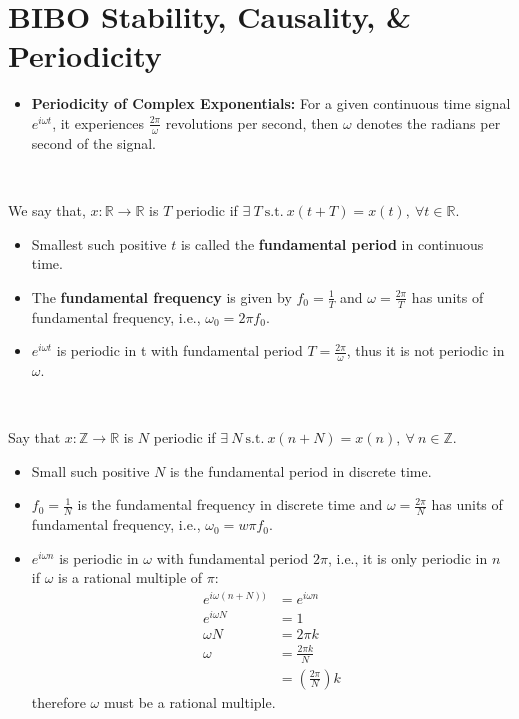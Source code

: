 \section{BIBO Stability, Causality, \& Periodicity}
\begin{itemize}
	\item \textbf{Periodicity of Complex Exponentials:} For a given continuous
	      time signal $e^{i\omega t}$, it experiences $\frac{2\pi}{\omega}$ revolutions per second,
	      then $\omega$ denotes the radians per second of the signal.
\end{itemize}
\begin{theorem}~

	We say that, $x: \mathbb{R} \to \mathbb{R}$ is $T$ periodic if
	$\exists\ T\ \mathrm{s.t.}\ x(t +T) = x(t),\ \forall t \in \mathbb{R}$.
\end{theorem}
\begin{itemize}
	\item Smallest such positive $t$ is called the
	      \textbf{fundamental period} in continuous time.
	\item The \textbf{fundamental frequency} is given by $f_0 = \frac{1}{T}$
	      and $\omega = \frac{2\pi}{T}$ has units of fundamental frequency, i.e.,
	      $\omega_0 = 2\pi f_0$.
	\item $e^{i\omega t}$ is periodic in t with fundamental period $T = \frac{2\pi}{\omega}$,
	      thus it is not periodic in $\omega$.
\end{itemize}
\begin{theorem}~

	Say that $x: \mathbb{Z} \to \mathbb{R}$
	is $N$ periodic if $\exists\ N \ \mathrm{s.t.}\ x(n+N) = x(n),\ \forall\ n \in \mathbb{Z}$.
\end{theorem}
\begin{itemize}
	\item Small such positive $N$ is the fundamental period in discrete time.
	\item $f_{0} = \frac{1}{N}$ is the fundamental frequency in discrete time
	      and $\omega = \frac{2\pi}{N}$ has units of fundamental frequency, i.e.,
	      $\omega_0 = w\pi f_0$.
	\item $e^{i\omega n}$ is periodic in $\omega$ with fundamental period
	      $2\pi$, i.e., it is only periodic in $n$ if $\omega$ is a rational
	      multiple of $\pi$:
	      \begin{align*}
		      e^{i\omega(n+N))} & = e^{i\omega n}     \\
		      e^{i\omega N}     & = 1                 \\
		      \omega N          & = 2\pi k            \\
		      \omega            & = \frac{2\pi k}{N}  \\
		                        & = (\frac{2\pi}{N})k
	      \end{align*}
	      therefore $\omega$ must be a rational multiple.
\end{itemize}
